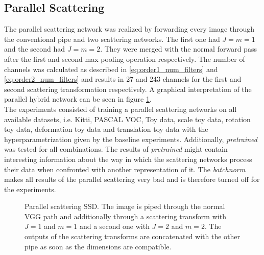 \subsection{Parallel Scattering}
\label{subsec:parallel_scattering_experiment}

The parallel scattering network was realized by forwarding every image through the conventional pipe and two scattering networks. The first one had $J=m =1$ and the second had $J=m=2$. They were merged with the normal forward pass after the first and second max pooling operation respectively. The number of channels was calculated as described in \ref{eq:order1_num_filters} and \ref{eq:order2_num_filters} and results in 27 and 243 channels for the first and second scattering transformation respectively. A graphical interpretation of the parallel hybrid network can be seen in figure \ref{fig:parallel_scattering_SSD}.  \\
The experiments consisted of training a parallel scattering networks on all available datasets, i.e. Kitti, PASCAL VOC, Toy data, scale toy data, rotation toy data, deformation toy data and translation toy data with the hyperparametrization given by the baseline experiments. Additionally, \textit{pretrained} was tested for all combinations. The results of \textit{pretrained} might contain interesting information about the way in which the scattering networks process their data when confronted with another representation of it. The \textit{batchnorm} makes all results of the parallel scattering very bad and is therefore turned off for the experiments. 

\begin{figure}[!htb]
	\centering
	\caption{Parallel scattering SSD. The image is piped through the normal VGG path and additionally through a scattering transform with $J=1$ and $m=1$ and a second one with $J=2$ and $m=2$. The outputs of the scattering transforms are concatenated with the other pipe as soon as the dimensions are compatible.}
	\label{fig:parallel_scattering_SSD}
\end{figure}

